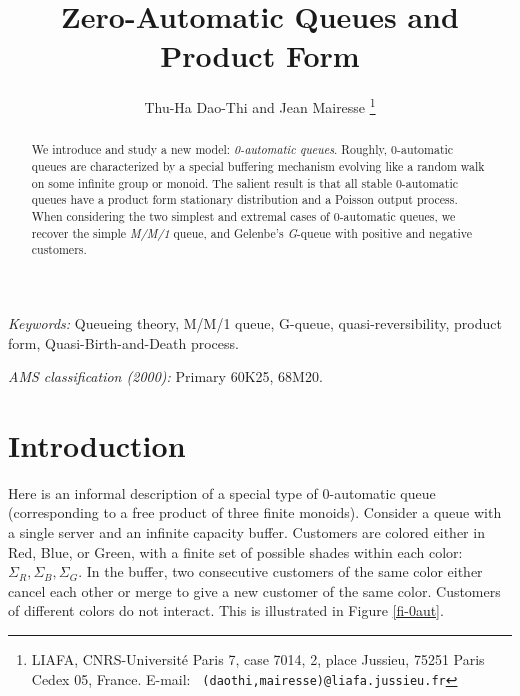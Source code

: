 \documentclass[11pt,a4paper]{article}
\theoremstyle{remark}
\begin{document}
\sloppy

\title{\bf Zero-Automatic Queues and Product Form}

\author{Thu-Ha {\sc Dao-Thi} and  Jean {\sc Mairesse}
\thanks{LIAFA, CNRS-Universit\'e Paris 7, case
    7014, 2, place Jussieu, 75251 Paris Cedex 05, France. E-mail: {\tt
      (daothi,mairesse)@liafa.jussieu.fr}}}

\maketitle



\begin{abstract}
We introduce and study a new model: {\em 0-automatic
  queues}. Roughly, 0-automatic queues are
characterized by a special buffering mechanism evolving like a
random walk on some infinite group or monoid. The salient result
is that all stable 0-automatic queues have a product form stationary
  distribution and a Poisson output process. When
considering the two simplest and extremal cases of 0-automatic
queues, we recover the simple \emph{M/M/1} queue, and Gelenbe's
\emph{G}-queue with positive and negative customers.
\end{abstract}



\textsl{Keywords:} Queueing theory, M/M/1 queue, G-queue,
quasi-reversibility, product form, Quasi-Birth-and-Death process.

\smallskip

\textsl{AMS classification (2000):} Primary 60K25, 68M20.











\section{Introduction}

Here is an informal description of a special type of 0-automatic
queue (corresponding to a free product of three finite
monoids). Consider a queue with a single server and an infinite
capacity buffer.
Customers are colored either in Red, Blue, or
Green, with a finite set of possible shades within each color:
$\Sigma_R, \Sigma_B, \Sigma_G$.
In the buffer, two consecutive customers of the
same color either cancel each other or merge to give a new
customer of the same color. Customers of different colors do not
interact.
This is illustrated in Figure \ref{fi-0aut}.
\end{document}
